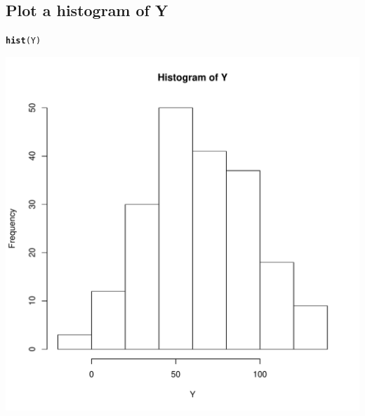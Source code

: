 \documentclass{article}\usepackage[]{graphicx}\usepackage[]{color}
\makeatletter
\def\maxwidth{ %
  \ifdim\Gin@nat@width>\linewidth
    \linewidth
  \else
    \Gin@nat@width
  \fi
}
\newcommand{\hlstd}[1]{\textcolor[rgb]{0.345,0.345,0.345}{#1}}%
\newcommand{\hlkwd}[1]{\textcolor[rgb]{0.737,0.353,0.396}{\textbf{#1}}}%
\newenvironment{kframe}{%
 \def\at@end@of@kframe{}%
 \ifinner\ifhmode%
  \def\at@end@of@kframe{\end{minipage}}%
  \begin{minipage}{\columnwidth}%
 \fi\fi%
 \def\FrameCommand##1{\hskip\@totalleftmargin \hskip-\fboxsep
 \colorbox{shadecolor}{##1}\hskip-\fboxsep
     \hskip-\linewidth \hskip-\@totalleftmargin \hskip\columnwidth}%
 \MakeFramed {\advance\hsize-\width
   \@totalleftmargin\z@ \linewidth\hsize
   \@setminipage}}%
 {\par\unskip\endMakeFramed%
 \at@end@of@kframe}
\newenvironment{knitrout}{}{} %
\makeatother
\begin{document}
\subsection{Plot a histogram of Y}
\begin{knitrout}
\color{fgcolor}\begin{kframe}
\begin{alltt}
\hlkwd{hist}\hlstd{(Y)}
\end{alltt}
\end{kframe}
\includegraphics[width=\maxwidth]{figure/unnamed-chunk-13-1} 

\end{knitrout}
\end{document}
